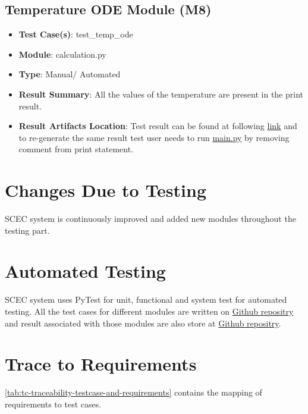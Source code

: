 \documentclass[12pt, titlepage]{article}
\begin{document}
\subsection{Temperature ODE Module (M8)} 
\begin{itemize}
    \item \textbf{Test Case(s)}: test\_temp\_ode
    \item \textbf{Module}: calculation.py
    \item \textbf{Type}: Manual/ Automated 
    \item \textbf{Result Summary}: All the values of the temperature are present in the print result. 
    \item \textbf{Result Artifacts Location}: Test result can be found at following \href{https://github.com/DeeshaPatel/CAS-741-Solar-Cooker/blob/9a7ae69a1b005561bb8ac5d16c9275f5805ed72f/test/Unit%20test/result_temperature.log}{link} and to re-generate the same result test user needs to run \href{https://github.com/DeeshaPatel/CAS-741-Solar-Cooker/blob/aa683cc4b92f631607346b8ae28d9ff73b78d420/src/src/main.py}{main.py} by removing comment from print statement.   
\end{itemize}


\section{Changes Due to Testing}

SCEC system is continuously improved and added new modules throughout the testing part. 

\section{Automated Testing}

SCEC system uses PyTest for unit, functional and system test for automated testing. All the test cases for different modules are written on \href{https://github.com/DeeshaPatel/CAS-741-Solar-Cooker/tree/main/src/testing}{Github repositry} and result associated with those modules are also store at \href{https://github.com/DeeshaPatel/CAS-741-Solar-Cooker/tree/main/test}{Github repositry}.  
		
\section{Trace to Requirements}

\autoref{tab:tc-traceability-testcase-and-requirements} contains the mapping of requirements to test cases. 
\end{document}
